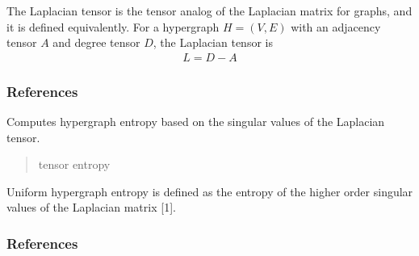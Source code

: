 \documentclass[letterpaper,10pt,english]{sphinxmanual}
\begin{document}
\begin{fulllineitems}
\begin{fulllineitems}
\begin{quote}
\begin{description}
\sphinxAtStartPar
{}

\end{description}\end{quote}

\sphinxAtStartPar
The Laplacian tensor is the tensor analog of the Laplacian matrix for graphs, and it is
defined equivalently. For a hypergraph \(H=(V,E)\) with an adjacency tensor \(A\)
and degree tensor \(D\), the Laplacian tensor is
\begin{equation*}
\begin{split}L = D - A\end{split}
\end{equation*}\subsubsection*{References}

\end{fulllineitems}


\begin{fulllineitems}
\label{\detokenize{HAT:HAT.Hypergraph.Hypergraph.tensorEntropy}}
\pysigstartsignatures
{}
\pysigstopsignatures
\sphinxAtStartPar
Computes hypergraph entropy based on the singular values of the Laplacian tensor.
\begin{quote}\begin{description}
\sphinxAtStartPar
tensor entropy

\sphinxAtStartPar
{}

\end{description}\end{quote}

\sphinxAtStartPar
Uniform hypergraph entropy is defined as the entropy of the higher order singular
values of the Laplacian matrix {[}1{]}.
\subsubsection*{References}

\end{fulllineitems}



\end{fulllineitems}
\end{document}
